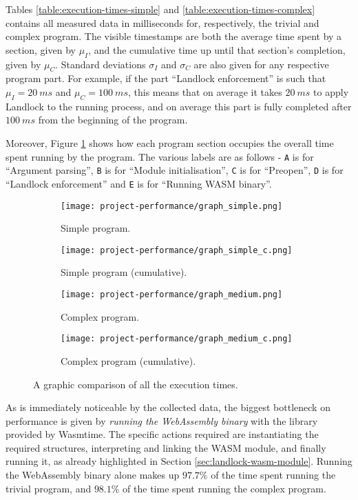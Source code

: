 Tables \ref{table:execution-times-simple} and \ref{table:execution-times-complex} contains
all measured data in milliseconds for, respectively, the trivial and complex program.
The visible timestamps are both the average time spent by a section, given by $\mu_I$,
and the cumulative time up until that section's completion, given by $\mu_C$.
Standard deviations $\sigma_I$ and $\sigma_C$ are also given for any respective program part.
For example, if the part ``Landlock enforcement'' is such that $\mu_I = 20\ ms$ and $\mu_C = 100\ ms$,
this means that on average it takes $20\ ms$ to apply Landlock to the running process, and on average this part
is fully completed after $100\ ms$ from the beginning of the program.

Moreover, Figure \ref{fig:perf-execution-times-comparison} shows how each program section
occupies the overall time spent running by the program. The various labels are as follows
- \texttt{A} is for ``Argument parsing'', \texttt{B} is for ``Module initialisation'',
\texttt{C} is for ``Preopen'', \texttt{D} is for ``Landlock enforcement'' and
\texttt{E} is for ``Running WASM binary''.

\begin{figure}[ht!]
  \centering
  
  \begin{subfigure}[b]{0.49\textwidth}
    \texttt{[image: project-performance/graph\_simple.png]}
    \caption{Simple program.}
  \end{subfigure}
  \begin{subfigure}[b]{0.49\textwidth}
    \texttt{[image: project-performance/graph\_simple\_c.png]}
    \caption{Simple program (cumulative).}
  \end{subfigure}

  \begin{subfigure}[b]{0.49\textwidth}
    \texttt{[image: project-performance/graph\_medium.png]}
    \caption{Complex program.}
  \end{subfigure}
  \begin{subfigure}[b]{0.49\textwidth}
    \texttt{[image: project-performance/graph\_medium\_c.png]}
    \caption{Complex program (cumulative).}
  \end{subfigure}

  \caption{A graphic comparison of all the execution times.}
  \label{fig:perf-execution-times-comparison}
\end{figure}

As is immediately noticeable by the collected data, the biggest bottleneck on performance is given
by \textit{running the WebAssembly binary} with the library provided by Wasmtime.
The specific actions required are instantiating the required structures, interpreting and linking the WASM module,
and finally running it, as already highlighted in Section \ref{sec:landlock-wasm-module}.
Running the WebAssembly binary alone makes up $97.7 \%$ of the time spent running the trivial program, and $98.1 \%$ of the time
spent running the complex program.

